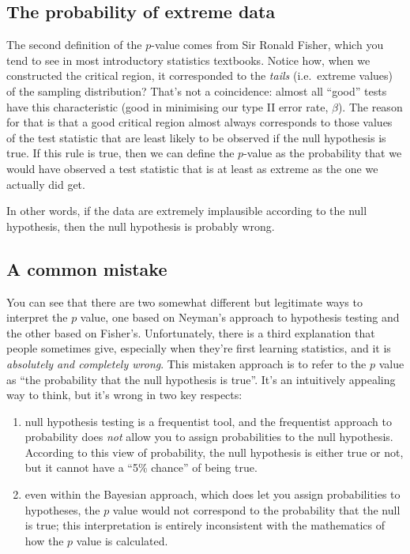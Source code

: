 \documentclass[
  11pt,
  a4paper,
  twoside,symmetric,openright]{book}
\providecommand{\tightlist}{%
  \setlength{\itemsep}{0pt}\setlength{\parskip}{0pt}}
\theoremstyle{break}
\theoremstyle{break}
\begin{document}
\subsection{The probability of extreme data}\label{the-probability-of-extreme-data}

The second definition of the \(p\)-value comes from Sir Ronald Fisher, which you tend to see in most introductory statistics textbooks. Notice how, when we constructed the critical region, it corresponded to the \emph{tails} (i.e.~extreme values) of the sampling distribution? That's not a coincidence: almost all ``good'' tests have this characteristic (good in minimising our type II error rate, \(\beta\)). The reason for that is that a good critical region almost always corresponds to those values of the test statistic that are least likely to be observed if the null hypothesis is true. If this rule is true, then we can define the \(p\)-value as the probability that we would have observed a test statistic that is at least as extreme as the one we actually did get.

In other words, if the data are extremely implausible according to the null hypothesis, then the null hypothesis is probably wrong.

\subsection{A common mistake}\label{a-common-mistake}

You can see that there are two somewhat different but legitimate ways to interpret the \(p\) value, one based on Neyman's approach to hypothesis testing and the other based on Fisher's. Unfortunately, there is a third explanation that people sometimes give, especially when they're first learning statistics, and it is \emph{absolutely and completely wrong}. This mistaken approach is to refer to the \(p\) value as ``the probability that the null hypothesis is true''. It's an intuitively appealing way to think, but it's wrong in two key respects:

\begin{enumerate}
\def\labelenumi{(\arabic{enumi})}
\tightlist
\item
  null hypothesis testing is a frequentist tool, and the frequentist approach to probability does \emph{not} allow you to assign probabilities to the null hypothesis. According to this view of probability, the null hypothesis is either true or not, but it cannot have a ``5\% chance'' of being true.
\item
  even within the Bayesian approach, which does let you assign probabilities to hypotheses, the \(p\) value would not correspond to the probability that the null is true; this interpretation is entirely inconsistent with the mathematics of how the \(p\) value is calculated.
\end{enumerate}
\end{document}

